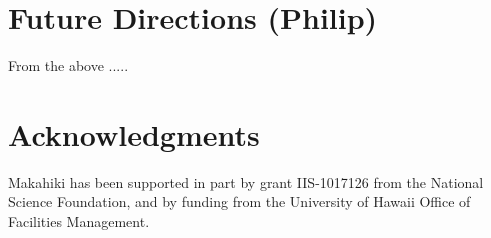 \documentclass{acm_proc_article-sp}
\begin{document}
\section{Future Directions (Philip)}
From the above .....

\section{Acknowledgments}
Makahiki has been supported in part by grant IIS-1017126 from the National
Science Foundation, and by funding from the University of Hawaii Office of Facilities
Management. 


  

\balancecolumns
\end{document}
